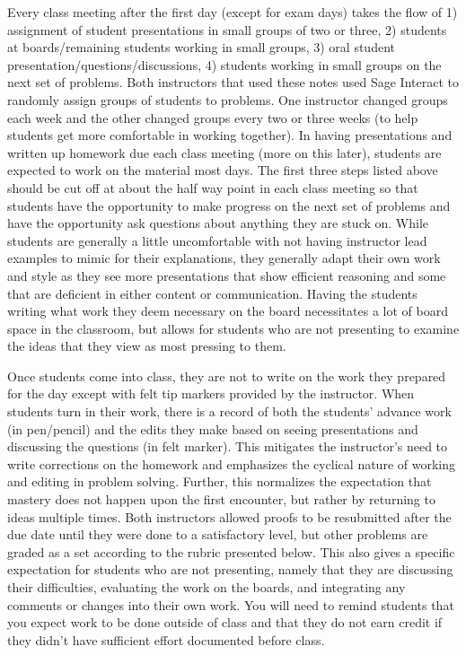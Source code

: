 \begin{annotation}
Every class meeting after the first day (except for exam days) takes the flow of 1) assignment of student presentations in small groups of two or three, 2) students at boards/remaining students working in small groups, 3) oral student presentation/questions/discussions, 4) students working in small groups on the next set of problems. Both instructors that used these notes used Sage Interact to randomly assign groups of students to problems. One instructor changed groups each week and the other changed groups every two or three weeks (to help students get more comfortable in working together). In having presentations and written up homework due each class meeting (more on this later), students are expected to work on the material most days. The first three steps listed above should be cut off at about the half way point in each class meeting so that students have the opportunity to make progress on the next set of problems and have the opportunity ask questions about anything they are stuck on. While students are generally a little uncomfortable with not having instructor lead examples to mimic for their explanations, they generally adapt their own work and style as they see more presentations that show efficient reasoning and some that are deficient in either content or communication. Having the students writing what work they deem necessary on the board necessitates a lot of board space in the classroom, but allows for students who are not presenting to examine the ideas that they view as most pressing to them.

Once students come into class, they are not to write on the work they prepared for the day except with felt tip markers provided by the instructor. When students turn in their work, there is a record of both the students' advance work (in pen/pencil) and the edits they make based on seeing presentations and discussing the questions (in felt marker). This mitigates the instructor’s need to write corrections on the homework and emphasizes the cyclical nature of working and editing in problem solving. Further, this normalizes the expectation that mastery does not happen upon the first encounter, but rather by returning to ideas multiple times. Both instructors allowed proofs to be resubmitted after the due date until they were done to a satisfactory level, but other problems are graded as a set according to the rubric presented below. This also gives a specific expectation for students who are not presenting, namely that they are discussing their difficulties, evaluating the work on the boards, and integrating any comments or changes into their own work. You will need to remind students that you expect work to be done outside of class and that they do not earn credit if they didn't have sufficient effort documented before class.


\end{annotation}
